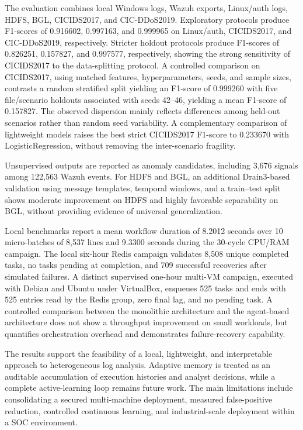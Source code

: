 \documentclass[12pt,a4paper,oneside]{report}
\begin{document}
The evaluation combines local Windows logs, Wazuh exports, Linux/auth logs, HDFS, BGL, CICIDS2017, and CIC-DDoS2019. Exploratory protocols produce F1-scores of 0.916602, 0.997163, and 0.999965 on Linux/auth, CICIDS2017, and CIC-DDoS2019, respectively. Stricter holdout protocols produce F1-scores of 0.826251, 0.157827, and 0.997577, respectively, showing the strong sensitivity of CICIDS2017 to the data-splitting protocol. A controlled comparison on CICIDS2017, using matched features, hyperparameters, seeds, and sample sizes, contrasts a random stratified split yielding an F1-score of 0.999260 with five file/scenario holdouts associated with seeds 42--46, yielding a mean F1-score of 0.157827. The observed dispersion mainly reflects differences among held-out scenarios rather than random seed variability. A complementary comparison of lightweight models raises the best strict CICIDS2017 F1-score to 0.233670 with LogisticRegression, without removing the inter-scenario fragility.

Unsupervised outputs are reported as anomaly candidates, including 3,676 signals among 122,563 Wazuh events. For HDFS and BGL, an additional Drain3-based validation using message templates, temporal windows, and a train--test split shows moderate improvement on HDFS and highly favorable separability on BGL, without providing evidence of universal generalization.

Local benchmarks report a mean workflow duration of 8.2012 seconds over 10 micro-batches of 8,537 lines and 9.3300 seconds during the 30-cycle CPU/RAM campaign. The local six-hour Redis campaign validates 8,508 unique completed tasks, no tasks pending at completion, and 709 successful recoveries after simulated failures. A distinct supervised one-hour multi-VM campaign, executed with Debian and Ubuntu under VirtualBox, enqueues 525 tasks and ends with 525 entries read by the Redis group, zero final lag, and no pending task. A controlled comparison between the monolithic architecture and the agent-based architecture does not show a throughput improvement on small workloads, but quantifies orchestration overhead and demonstrates failure-recovery capability.

The results support the feasibility of a local, lightweight, and interpretable approach to heterogeneous log analysis. Adaptive memory is treated as an auditable accumulation of execution histories and analyst decisions, while a complete active-learning loop remains future work. The main limitations include consolidating a secured multi-machine deployment, measured false-positive reduction, controlled continuous learning, and industrial-scale deployment within a SOC environment.
\end{document}
